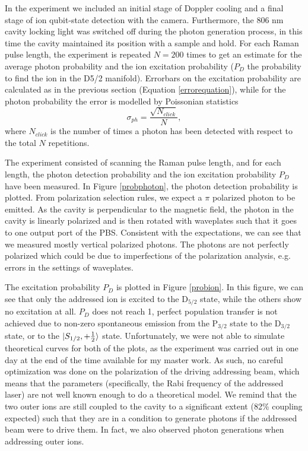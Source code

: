 In the experiment we included an initial stage of Doppler cooling and a final stage of ion qubit-state detection with the camera. Furthermore, the 806 nm cavity locking light was switched off during the photon generation process, in this time the cavity maintained its position with a sample and hold. For each Raman pulse length, the experiment is repeated $N=200$ times to get an estimate for the average photon probability and the ion excitation probability ($P_D$ the probability to find the ion in the D5/2 manifold). Errorbars on the excitation probability are calculated as in the previous section (Equation \eqref{errorequation}), while for the photon probability the error is modelled by Poissonian statistics \cite{quantumoptics}
\begin{equation}
\sigma_{ph} = \frac{\sqrt{N_{click}}}{N},
\end{equation}
where $N_{click}$ is the number of times a photon has been detected with respect to the total $N$ repetitions. \par
The experiment consisted of scanning the Raman pulse length, and for each length, the photon detection probability and the ion excitation probability $P_D$ have been measured. In Figure \ref{probphoton}, the photon detection probability is plotted. From polarization selection rules, we expect a $\pi$ polarized photon to be emitted. As the cavity is perpendicular to the magnetic field, the photon in the cavity is linearly polarized and is then rotated with waveplates such that it goes to one output port of the PBS. Consistent with the expectations, we can see that we measured mostly vertical polarized photons. The photons are not perfectly polarized which could be due to imperfections of the polarization analysis, e.g. errors in the settings of waveplates.\par
The excitation probability $P_D$ is plotted in Figure \ref{probion}. In this figure, we can see that only the addressed ion is excited to the $\text{D}_{5/2}$ state, while the others show no excitation at all. $P_D$ does not reach 1, perfect population transfer is not achieved due to non-zero spontaneous emission from the $\text{P}_{3/2}$ state to the $\text{D}_{3/2}$ state, or to the $\ket{S_{1/2},+\frac{1}{2}}$ state. Unfortunately, we were not able to simulate theoretical curves for both of the plots, as the experiment was carried out in one day at the end of the time available for my master work. As such, no careful optimization was done on the polarization of the driving addressing beam, which means that the parameters (specifically, the Rabi frequency of the addressed laser) are not well known enough to do a theoretical model. We remind that the two outer ions are still coupled to the cavity to a significant extent (82\% coupling expected) such that they are in a condition to generate photons if the addressed beam were to drive them. In fact, we also observed photon generations when addressing outer ions.\par
